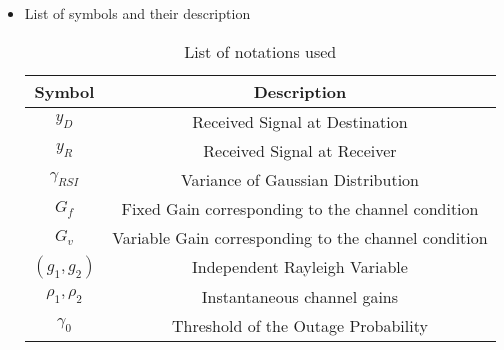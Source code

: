 \documentclass{article}
\begin{document}
\begin{itemize}
\item List of symbols and their description

\begin{table}[]
 \centering
 \caption{List of notations used}
 
 \begin{tabular}{|c|c|}
 \hline
 \textbf{Symbol} & \textbf{Description}                                                                                           \\ \hline
$ y_{D}$          & Received Signal at Destination                                                                                       \\ \hline
 $ y_{R}$        & Received Signal at Receiver                                                                                     \\ \hline
 $\gamma_{RSI} $       & Variance of Gaussian Distribution                                                                                                                                                        \\ \hline
 $G_{f} $       & Fixed Gain corresponding to the channel condition                                                                                                                                                       \\ \hline
 $G_{v} $       & Variable Gain corresponding to the channel condition                                                                                                                                                           \\ \hline 
  $(g_{1}, g_{2}) $       & Independent Rayleigh Variable   
                                                                    \\ \hline
    $\rho_{1},\rho_{2} $       & Instantaneous channel gains                                                                                                                                      \\ \hline
    $\gamma_{0} $       & Threshold of the Outage Probability  
                                                                    \\ \hline
                                                                    

\end{tabular}
\end{table}
\end{itemize}
\end{document}
